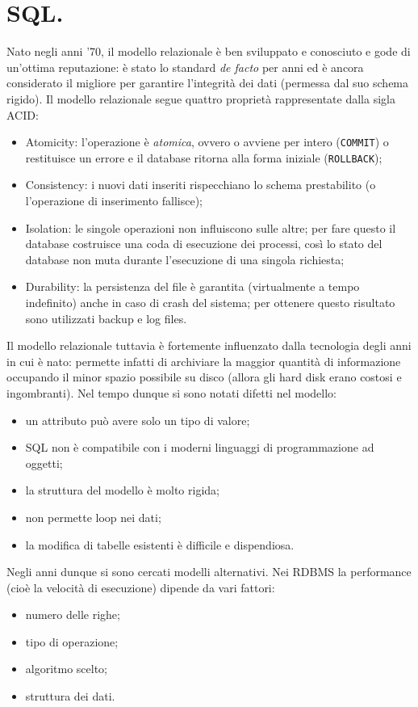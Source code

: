 \documentclass[a4page, 11pt]{article}
\begin{document}
\section{SQL.}
Nato negli anni '70, il modello relazionale è ben sviluppato e conosciuto e gode di un'ottima reputazione: è stato lo standard \textit{de facto} per anni ed è ancora considerato il migliore per garantire l'integrità dei dati (permessa dal suo schema rigido).
Il modello relazionale segue quattro proprietà rappresentate dalla sigla ACID:
\begin{itemize}
\item Atomicity: l'operazione è \textit{atomica}, ovvero o avviene per intero (\verb|COMMIT|) o restituisce un errore e il database ritorna alla forma iniziale (\verb|ROLLBACK|);
\item Consistency: i nuovi dati inseriti rispecchiano lo schema prestabilito (o l'operazione di inserimento fallisce);
\item Isolation: le singole operazioni non influiscono sulle altre; per fare questo il database costruisce una coda di esecuzione dei processi, così lo stato del database non muta durante l'esecuzione di una singola richiesta;
\item Durability: la persistenza del file è garantita (virtualmente a tempo indefinito) anche in caso di crash del sistema; per ottenere questo risultato sono utilizzati backup e log files.
\end{itemize}

Il modello relazionale tuttavia è fortemente influenzato dalla tecnologia degli anni in cui è nato: permette infatti di archiviare la maggior quantità di informazione occupando il minor spazio possibile su disco (allora gli hard disk erano costosi e ingombranti).
Nel tempo dunque si sono notati difetti nel modello:
\begin{itemize}[noitemsep]
\item un attributo può avere solo un tipo di valore;
\item SQL non è compatibile con i moderni linguaggi di programmazione ad oggetti;
\item la struttura del modello è molto rigida;
\item non permette loop nei dati;
\item la modifica di tabelle esistenti è difficile e dispendiosa.
\end{itemize}

Negli anni dunque si sono cercati modelli alternativi.
Nei RDBMS la performance (cioè la velocità di esecuzione) dipende da vari fattori:
\begin{itemize}
\item numero delle righe;
\item tipo di operazione;
\item algoritmo scelto;
\item struttura dei dati.
\end{itemize}
\end{document}
